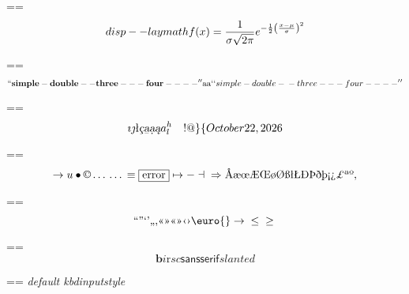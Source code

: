\documentclass{book}
\makeatletter
\newcommand\GNUTexinfocommandstyletextkbd[1]{{\ttfamily\textsl{#1}}}%
\newenvironment{GNUTexinfopreformatted}{%
  \par\GNUTobeylines\obeyspaces\frenchspacing
  \parskip=\z@\parindent=\z@}{}
{\catcode`\^^M=13 \gdef\GNUTobeylines{\catcode`\^^M=13 \def^^M{\null\par}}}
\newenvironment{GNUTexinfoindented}
  {\begin{list}{}{}
  \item\relax}
  {\end{list}}
\makeatother
\begin{document}
\begin{GNUTexinfoindented}
\begin{GNUTexinfopreformatted}
\end{GNUTexinfopreformatted}
$$
disp--laymath
f(x) = {1 \over \sigma \sqrt{2\pi}}e^{-{1 \over 2}\left({x-\mu \over \sigma}\right)^2}
$$
\begin{GNUTexinfopreformatted}%
\ttfamily 
\end{GNUTexinfopreformatted}
$$
\mathbf{``simple-double--three---four----''} \hbox{aa}
`\hbox{}`simple-double-\hbox{}-three---four----'\hbox{}'
$$
\begin{GNUTexinfopreformatted}%
\ttfamily 
\end{GNUTexinfopreformatted}
$$
\imath{} \jmath{}
\mathord{\text{\l{}}} \textsl{\c{c}}
\textsl{\b{a}} \textsl{\d{a}} \textsl{\k{a}} a^{h}_{l}
 \ {}\ {} \ {}\-{}  ! @ \} \{ 
\today{}
$$
\begin{GNUTexinfopreformatted}%
\ttfamily 
\end{GNUTexinfopreformatted}
$$
\rightarrow{}
u
\bullet{} \copyright{} \dots{} \dots{} \equiv{}
\fbox{error} \mapsto{} - \dashv{} \Rightarrow{}
\mathord{\text{\AA{}}} \mathord{\text{\ae{}}} \mathord{\text{\oe{}}} \mathord{\text{\AE{}}} \mathord{\text{\OE{}}} \mathord{\text{\o{}}} \mathord{\text{\O{}}} \mathord{\text{\ss{}}} \mathord{\text{\l{}}} \mathord{\text{\L{}}} \mathord{\text{\DH{}}}
\mathord{\text{\TH{}}} \mathord{\text{\dh{}}} \mathord{\text{\th{}}} \mathord{\text{\textexclamdown{}}} \mathord{\text{\textquestiondown{}}} \mathsterling{}
\mathord{\text{\textordfeminine{}}} \mathord{\text{\textordmasculine{}}} , 
$$
\begin{GNUTexinfopreformatted}%
\ttfamily 
\end{GNUTexinfopreformatted}
$$
\mathord{\text{\textquotedblleft{}}} \mathord{\text{\textquotedblright{}}} 
\mathord{\text{\textquoteleft{}}} \mathord{\text{\textquoteright{}}} \mathord{\text{\quotedblbase{}}} \mathord{\text{\quotesinglbase{}}} \mathord{\text{\guillemotleft{}}}
\mathord{\text{\guillemotright{}}} \mathord{\text{\guillemotleft{}}} \mathord{\text{\guillemotright{}}} \mathord{\text{\guilsinglleft{}}}
\mathord{\text{\guilsinglright{}}} \euro{} \rightarrow{} \leq{} \geq{}
$$
\begin{GNUTexinfopreformatted}%
\ttfamily 
\end{GNUTexinfopreformatted}
$$
\mathbf{b} \mathit{i} \mathrm{r} sc \mathsf{sansserif} slanted
$$
\begin{GNUTexinfopreformatted}%
\ttfamily 
\GNUTexinfocommandstyletextkbd{default kbdinputstyle}
\end{GNUTexinfopreformatted}
\begin{description}

\end{description}
\end{GNUTexinfoindented}
\end{document}
